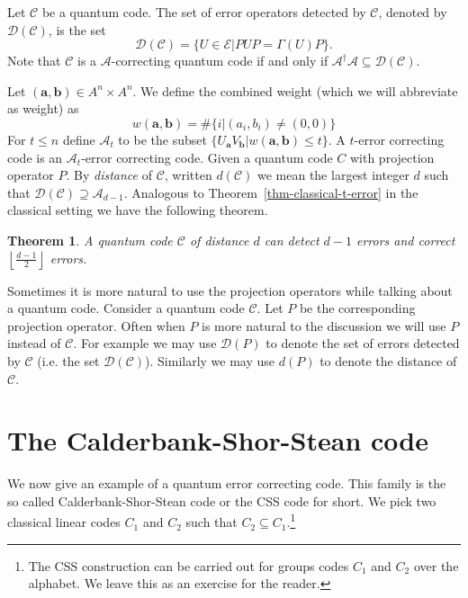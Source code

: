 \documentclass[11pt,twoside]{article}
\newtheorem{theorem}{Theorem}[section]
\theoremstyle{definition}
\theoremstyle{remark}
\newcommand{\Weight}[1]{\ensuremath{w\left(#1\right)}}
\newcommand{\floor}[1]{\ensuremath{\left\lfloor #1 \right\rfloor}}
\begin{document}
Let $\mathcal{C}$ be a quantum code. The set of error operators
detected by $\mathcal{C}$, denoted by $\mathcal{D}(\mathcal{C})$, is the set
\[
\mathcal{D}(\mathcal{C}) = \{ U \in \mathcal{E} | P U P = \Gamma(U) P
\}.
\]
Note that $\mathcal{C}$ is a $\mathcal{A}$-correcting quantum code if
and only if $\mathcal{A}^\dag \mathcal{A} \subseteq
\mathcal{D}(\mathcal{C})$.

Let $(\mathbf{a},\mathbf{b}) \in A^n \times A^n$. We define the
combined weight (which we will abbreviate as weight) as
\[
\Weight{\mathbf{a},\mathbf{b}} = \# \{ i | (a_i,b_i) \neq (0,0) \}
\]
For $t \leq n$ define $\mathcal{A}_t$ to be the subset $\{
U_{\mathbf{a}}V_{\mathbf{b}} | \Weight{\mathbf{a},\mathbf{b}} \leq t
\}$. A $t$-error correcting code is an $\mathcal{A}_t$-error
correcting code.  Given a quantum code $C$ with projection operator
$P$. By \emph{distance} of $\mathcal{C}$, written $d(\mathcal{C})$ we
mean the largest integer $d$ such that $\mathcal{D}(\mathcal{C})
\supseteq \mathcal{A}_{d-1}$.  Analogous to
Theorem~\ref{thm-classical-t-error} in the classical setting we have
the following theorem.

\begin{theorem}
  A quantum code $\mathcal{C}$ of distance $d$ can detect $d-1$ errors
  and correct $\floor{\frac{d-1}{2}}$ errors.
\end{theorem}

Sometimes it is more natural to use the projection operators while
talking about a quantum code. Consider a quantum code $\mathcal{C}$.
Let $P$ be the corresponding projection operator. Often when $P$ is
more natural to the discussion we will use $P$ instead of
$\mathcal{C}$. For example we may use $\mathcal{D}(P)$ to denote the
set of errors detected by $\mathcal{C}$ (i.e. the set
$\mathcal{D}(\mathcal{C})$).  Similarly we may use $d(P)$ to denote
the distance of $\mathcal{C}$.


\section{The Calderbank-Shor-Stean code}\label{sect-css}

We now give an example of a quantum error correcting code. This family
is the so called Calderbank-Shor-Stean code or the CSS code for short.
We pick two classical linear codes $C_1$ and $C_2$ such that $C_2
\subseteq C_1$.\footnote{The CSS construction can be carried out for
  groups codes $C_1$ and $C_2$ over the alphabet. We leave this as an
  exercise for the reader.}
\end{document}
